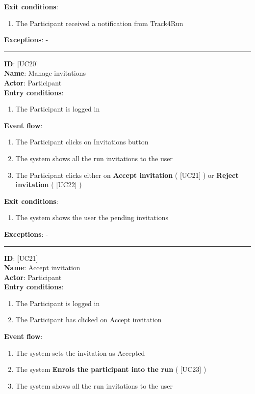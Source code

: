 \documentclass[a4paper, hidelinks, 12pt]{report}
\newcommand\usecase[1]{ [UC#1] }
\begin{document}
\begin{itemize}
		\textbf{Exit conditions}:
		\begin{enumerate}
			\item{The Participant received a notification from Track4Run}
		\end{enumerate}
		\textbf{Exceptions}: - \\
		\rule{\linewidth}{0.4pt}
		\textbf{ID}: \usecase{20} \\
		\textbf{Name}: Manage invitations \\
		\textbf{Actor}: Participant \\
		\textbf{Entry conditions}:
		\begin{enumerate}
			\item{The Participant is logged in}
		\end{enumerate}
		\textbf{Event flow}:
		\begin{enumerate}
			\item{The Participant clicks on Invitations button}
			\item{The system shows all the run invitations to the user}
			\item{The Participant clicks either on \textbf{Accept invitation} (\usecase{21}) or \textbf{Reject invitation} (\usecase{22})}
		\end{enumerate}
		\textbf{Exit conditions}:
		\begin{enumerate}
			\item{The system shows the user the pending invitations}
		\end{enumerate}
		\textbf{Exceptions}: - \\
		\rule{\linewidth}{0.4pt}
		\textbf{ID}: \usecase{21} \\
		\textbf{Name}: Accept invitation \\
		\textbf{Actor}: Participant \\
		\textbf{Entry conditions}:
		\begin{enumerate}
			\item{The Participant is logged in}
			\item{The Participant has clicked on Accept invitation}
		\end{enumerate}
		\textbf{Event flow}:
		\begin{enumerate}
			\item{The system sets the invitation as Accepted}
			\item{The system \textbf{Enrols the participant into the run} (\usecase{23})}
			\item{The system shows all the run invitations to the user}
		\end{enumerate}

\end{itemize}
\end{document}
